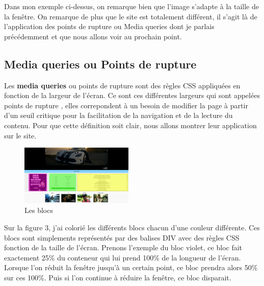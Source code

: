 \documentclass{article}
\begin{document}
Dans mon exemple ci-dessus, on remarque bien que l'image s'adapte \`a la taille de la fen\^etre. On remarque de plus que le site est totalement diff\'erent, il s'agit l\`a de l'application des points de rupture ou Media queries dont je parlais pr\'ec\'edemment et que nous allons voir au prochain point.

\subsection{Media queries ou Points de rupture}

Les \textbf{media queries} ou points de rupture sont des r\`egles CSS appliqu\'ees en fonction de la largeur de l'\'ecran. Ce sont ces diff\'erentes largeurs qui sont appel\'ees \og points de rupture \fg{}, elles correpondent \`a un besoin de modifier la page \`a partir d'un seuil critique pour la facilitation de la navigation et de la lecture du contenu. Pour que cette d\'efinition soit clair, nous allons montrer leur application sur le site. \\

\begin{figure}
  \vspace{-20pt}
  \begin{center}
    \includegraphics[width=0.48\textwidth]{p5}
  \end{center}
  \vspace{-20pt}
  \caption{Les blocs}
  \vspace{-10pt}
\end{figure} 

Sur la figure 3, j'ai colori\'e les diff\'erents blocs chacun d'une couleur diff\'erente. Ces blocs sont simplements repr\'esent\'es par des balises DIV avec des r\`egles CSS fonction de la taille de l'\'ecran. Prenons l'exemple du bloc violet, ce bloc fait exactement 25\% du conteneur qui lui prend 100\% de la longueur de l'\'ecran. Lorsque l'on r\'eduit la fen\^etre jusqu'\`a un certain point, ce bloc prendra alors 50\% sur ces 100\%. Puis si l'on continue \`a r\'eduire la fen\^etre, ce bloc disparait.\\  
\end{document}
